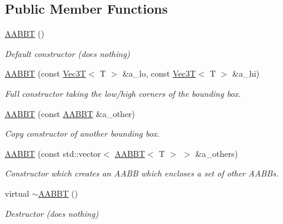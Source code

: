 \subsection*{Public Member Functions}
\begin{DoxyCompactItemize}
\item 
\mbox{\label{classBoundingVolumes_1_1AABBT_a180558daace1d1fb990f9e197eaec02d}} 
\hyperlink{classBoundingVolumes_1_1AABBT_a180558daace1d1fb990f9e197eaec02d}{A\+A\+B\+BT} ()
\begin{DoxyCompactList}\small\item\em Default constructor (does nothing) \end{DoxyCompactList}\item 
\hyperlink{classBoundingVolumes_1_1AABBT_a28d34a1b4467d329bd50e3561b1e705a}{A\+A\+B\+BT} (const \hyperlink{classVec3T}{Vec3T}$<$ T $>$ \&a\+\_\+lo, const \hyperlink{classVec3T}{Vec3T}$<$ T $>$ \&a\+\_\+hi)
\begin{DoxyCompactList}\small\item\em Full constructor taking the low/high corners of the bounding box. \end{DoxyCompactList}\item 
\hyperlink{classBoundingVolumes_1_1AABBT_af69dd29c29d40b1f550118cde9479f15}{A\+A\+B\+BT} (const \hyperlink{classBoundingVolumes_1_1AABBT}{A\+A\+B\+BT} \&a\+\_\+other)
\begin{DoxyCompactList}\small\item\em Copy constructor of another bounding box. \end{DoxyCompactList}\item 
\hyperlink{classBoundingVolumes_1_1AABBT_a08ddef449ffd740163b584c8ccd6f395}{A\+A\+B\+BT} (const std\+::vector$<$ \hyperlink{classBoundingVolumes_1_1AABBT}{A\+A\+B\+BT}$<$ T $>$ $>$ \&a\+\_\+others)
\begin{DoxyCompactList}\small\item\em Constructor which creates an A\+A\+BB which encloses a set of other A\+A\+B\+Bs. \end{DoxyCompactList}\item 
\mbox{\label{classBoundingVolumes_1_1AABBT_af0a2f67ce6f85f947849d199e6dee1aa}} 
virtual \hyperlink{classBoundingVolumes_1_1AABBT_af0a2f67ce6f85f947849d199e6dee1aa}{$\sim$\+A\+A\+B\+BT} ()
\begin{DoxyCompactList}\small\item\em Destructor (does nothing) \end{DoxyCompactList}\item 

\end{DoxyCompactItemize}
